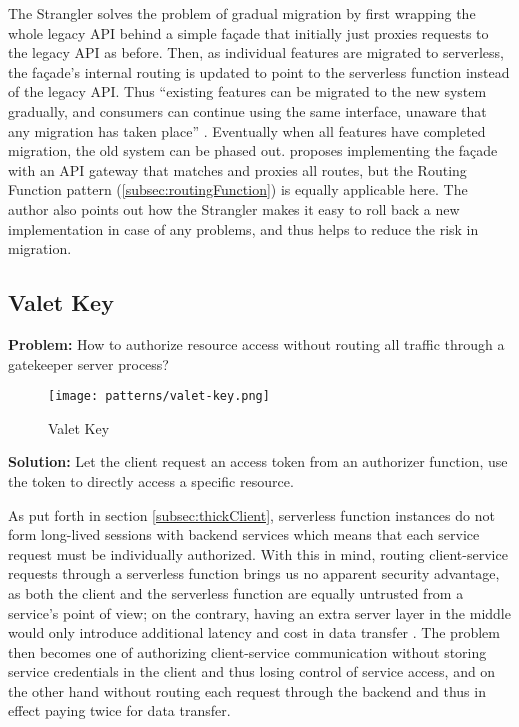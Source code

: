 The Strangler solves the problem of gradual migration by first wrapping the whole legacy API behind a simple façade that initially just proxies requests to the legacy API as before. Then, as individual features are migrated to serverless, the façade's internal routing is updated to point to the serverless function instead of the legacy API. Thus ``existing features can be migrated to the new system gradually, and consumers can continue using the same interface, unaware that any migration has taken place'' \parencite{microsoft18cloudPatterns}. Eventually when all features have completed migration, the old system can be phased out. \textcite{zambrano18patterns} proposes implementing the façade with an API gateway that matches and proxies all routes, but the Routing Function pattern (\ref{subsec:routingFunction}) is equally applicable here. The author also points out how the Strangler makes it easy to roll back a new implementation in case of any problems, and thus helps to reduce the risk in migration.

\subsection{Valet Key} \label{subsec:valetKey}

\textbf{Problem:} How to authorize resource access without routing all traffic through a gatekeeper server process?

\begin{figure}[h]
  \centering
  \texttt{[image: patterns/valet-key.png]}
  \caption{Valet Key}
  \label{fig:valetKey}
\end{figure}

\textbf{Solution:} Let the client request an access token from an authorizer function, use the token to directly access a specific resource.

As put forth in section \ref{subsec:thickClient}, serverless function instances do not form long-lived sessions with backend services which means that each service request must be individually authorized. With this in mind, routing client-service requests through a serverless function brings us no apparent security advantage, as both the client and the serverless function are equally untrusted from a service's point of view; on the contrary, having an extra server layer in the middle would only introduce additional latency and cost in data transfer \parencite{adzic2017serverless}. The problem then becomes one of authorizing client-service communication without storing service credentials in the client and thus losing control of service access, and on the other hand without routing each request through the backend and thus in effect paying twice for data transfer.

